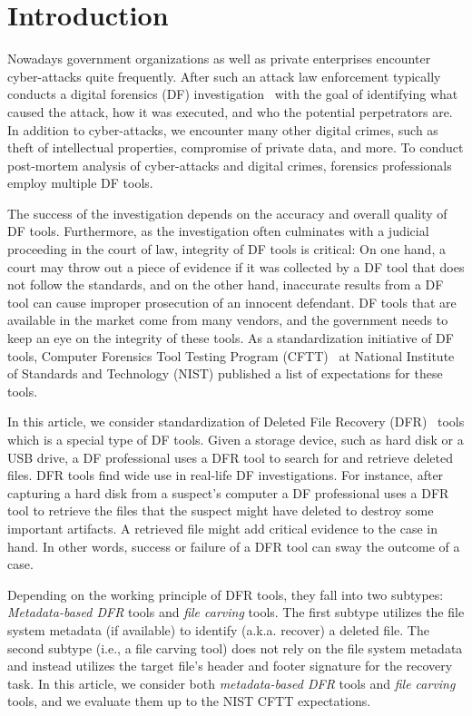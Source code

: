 \section{Introduction}\label{intro}

Nowadays government organizations as well as private enterprises encounter cyber-attacks quite frequently.
After such an attack law enforcement typically conducts a digital forensics (DF) investigation~\cite{df:news,cyber2011} 
with the goal of identifying what caused the attack, how it was executed, and who the potential perpetrators are. 
In addition to cyber-attacks, we encounter many other digital crimes, such as theft of intellectual properties, 
compromise of private data, and more. To conduct post-mortem analysis of cyber-attacks and digital crimes, forensics professionals
employ multiple DF tools. 

The success of the investigation depends on the accuracy and overall quality of DF tools.
Furthermore, as the investigation often culminates with a judicial proceeding in the court of law, integrity of DF tools 
is critical: On one hand, a court may throw out a piece of evidence if it was collected by a DF tool that does not follow the standards, 
and on the other hand, inaccurate results from a DF tool can cause improper prosecution of an innocent defendant. 
DF tools that are available in the market come from many vendors, and the government needs to keep an eye on the integrity of these tools. 
As a standardization initiative of DF tools,  Computer Forensics Tool Testing Program (CFTT)~\cite{cftt:nist} 
at National Institute of Standards and Technology (NIST) published a list of expectations for these tools. 

In this article, we consider standardization of Deleted File Recovery (DFR)~\cite{meta:dfr:standards,carving_standards} tools which is a special type of DF tools. 
Given a storage device, such as hard disk or a USB drive, a DF professional uses a DFR tool to search for and retrieve deleted files.
DFR tools find wide use in real-life DF investigations. For instance, after capturing a hard disk from a suspect's computer a
DF professional uses a DFR tool to retrieve the files that the suspect might have deleted to destroy some important artifacts.
A retrieved file might add critical evidence to the case in hand. In other words, success or failure of a DFR tool can sway the outcome of a case.

Depending on the working principle of DFR tools, they fall into two subtypes: \emph{Metadata-based DFR} tools and \emph{file carving} tools.
The first subtype utilizes the file system metadata (if available) to identify (a.k.a. recover) a deleted file. 
The second subtype (i.e., a file carving tool) does not rely on the file system metadata and instead utilizes the target file's 
header and footer signature for the recovery task. 
In this article, we consider both \emph{metadata-based DFR} tools and \emph{file carving} tools, and we evaluate them up to the NIST CFTT expectations.       

